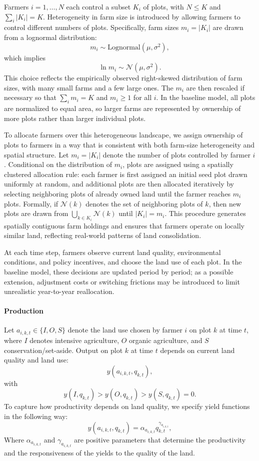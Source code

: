 \documentclass{article}
\begin{document}
Farmers $i = 1,\dots,N$ each control a subset $K_i$ of plots, with $N \leq K$ and $\sum_i |K_i| = K$. Heterogeneity in farm size is introduced by allowing farmers to control different numbers of plots. Specifically, farm sizes $m_i = |K_i|$ are drawn from a lognormal distribution:
\[
m_i \sim \text{Lognormal}(\mu, \sigma^2),
\]
which implies
\[
\ln m_i \sim \mathcal{N}(\mu, \sigma^2).
\]
This choice reflects the empirically observed right-skewed distribution of farm sizes, with many small farms and a few large ones. The $m_i$ are then rescaled if necessary so that $\sum_i m_i = K$ and $m_i \geq 1$ for all $i$. In the baseline model, all plots are normalized to equal area, so larger farms are represented by ownership of more plots rather than larger individual plots.

To allocate farmers over this heterogeneous landscape, we assign ownership of plots to farmers in a way that is consistent with both farm-size heterogeneity and spatial structure. Let $m_i = |K_i|$ denote the number of plots controlled by farmer $i$. Conditional on the distribution of $m_i$, plots are assigned using a spatially clustered allocation rule: each farmer is first assigned an initial seed plot drawn uniformly at random, and additional plots are then allocated iteratively by selecting neighboring plots of already owned land until the farmer reaches $m_i$ plots. Formally, if $\mathcal{N}(k)$ denotes the set of neighboring plots of $k$, then new plots are drawn from $\bigcup_{k \in K_i} \mathcal{N}(k)$ until $|K_i| = m_i$. This procedure generates spatially contiguous farm holdings and ensures that farmers operate on locally similar land, reflecting real-world patterns of land consolidation.

At each time step, farmers observe current land quality, environmental conditions, and policy incentives, and choose the land use of each plot. In the baseline model, these decisions are updated period by period; as a possible extension, adjustment costs or switching frictions may be introduced to limit unrealistic year-to-year reallocation.

\paragraph{Production}
Let $a_{i,k,t} \in \{I,O,S\}$ denote the land use chosen by farmer $i$ on plot $k$ at time $t$, where $I$ denotes intensive agriculture, $O$ organic agriculture, and $S$ conservation/set-aside. Output on plot $k$ at time $t$ depends on current land quality and land use:
\[
y(a_{i,k,t}, q_{k,t}),
\]
with
\[
y(I,q_{k,t}) > y(O,q_{k,t}) > y(S,q_{k,t}) = 0.
\]
To capture how productivity depends on land quality, we specify yield functions in the following way:
\[
y(a_{i,k,t},q_{k,t}) = \alpha_{a_{i,k,t}} q_{k,t}^{\gamma_{a_{i,k,t}}}, 
\]
Where $\alpha_{a_{i,k,t}}$ and $\gamma_{a_{i,k,t}}$ are positive parameters that determine the productivity and the responsiveness of the yields to the quality of the land. 
\end{document}

